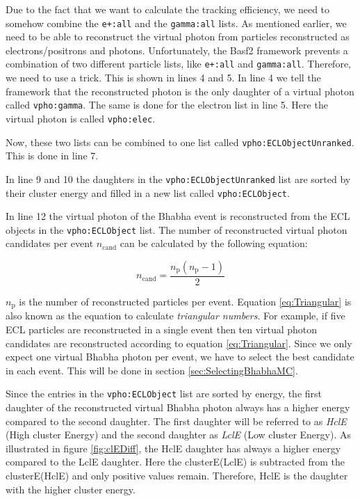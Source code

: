 \documentclass[a4paper,11pt,twosided,final,german,openbib,pdftex,listof=totoc,bibliography=totoc]{scrbook}
\begin{document}
Due to the fact that we want to calculate the tracking efficiency, we need to somehow combine the \texttt{e+:all} and the \texttt{gamma:all} lists. As mentioned earlier, we need to be able to reconstruct the virtual photon from particles reconstructed as electrons/positrons and photons.
Unfortunately, the Basf2 framework prevents a combination of two different particle lists, like \texttt{e+:all} and \texttt{gamma:all}. Therefore, we need to use a trick. This is shown in lines 4 and 5. In line 4 we tell the framework that the reconstructed photon is the only daughter of a virtual photon called \texttt{vpho:gamma}. The same is done for the electron list in line 5. Here the virtual photon is called \texttt{vpho:elec}. 

Now, these two lists can be combined to one list called \texttt{vpho:ECLObjectUnranked}. This is done in line 7.

In line 9 and 10 the daughters in the \texttt{vpho:ECLObjectUnranked} list are sorted by their cluster energy and filled in a new list called \texttt{vpho:ECLObject}.

In line 12 the virtual photon of the Bhabha event is reconstructed from the ECL objects in the \texttt{vpho:ECLObject} list. The number of reconstructed virtual photon candidates per event $n_{\textrm{cand}}$ can be calculated by the following equation\cite{triangular}:

\begin{equation}
n_{\textrm{cand}} = \frac{n_{\textrm{p}}(n_{\textrm{p}} -1)}{2}
\label{eq:Triangular}
\end{equation}

$n_{\textrm{p}}$ is the number of reconstructed particles per event. Equation \ref{eq:Triangular} is also known as the equation to calculate \textit{triangular numbers}. For example, if five ECL particles are reconstructed in a single event then ten virtual photon candidates are reconstructed according to equation \ref{eq:Triangular}. Since we only expect one virtual Bhabha photon per event, we have to select the best candidate in each event. This will be done in section \ref{sec:SelectingBhabhaMC}.

Since the entries in the \texttt{vpho:ECLObject} list are sorted by energy, the first daughter of the reconstructed virtual Bhabha photon always has a higher energy compared to the second daughter. The first daughter will be referred to as \textit{HclE} (High cluster Energy) and the second daughter as \textit{LclE} (Low cluster Energy). As illustrated in figure \ref{fig:clEDiff}, the HclE daughter has always a higher energy compared to the LclE daughter. Here the clusterE(LclE) is subtracted from the clusterE(HclE) and only positive values remain. Therefore, HclE is the daughter with the higher cluster energy.
\end{document}
